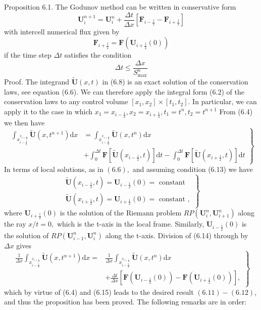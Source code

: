 Proposition 6.1. The Godunov method can be written in conservative form
$$
\mathbf{U}_{i}^{n+1}=\mathbf{U}_{i}^{n}+\frac{\Delta t}{\Delta x}\left[\mathbf{F}_{i-\frac{1}{2}}-\mathbf{F}_{i+\frac{1}{2}}\right]
$$
with intercell numerical flux given by
$$
\mathbf{F}_{i+\frac{1}{2}}=\mathbf{F}\left(\mathbf{U}_{i+\frac{1}{2}}(0)\right)
$$
if the time step $\Delta t$ satisfies the condition
$$
\Delta t \leq \frac{\Delta x}{S_{\max }^{n}}
$$
Proof. The integrand $\widetilde{\mathbf{U}}(x, t)$ in (6.8) is an exact solution of the conservation laws, see equation (6.6). We can therefore apply the integral form (6.2) of the conservation laws to any control volume $\left[x_{1}, x_{2}\right] \times\left[t_{1}, t_{2}\right] .$ In particular, we can apply it to the case in which $x_{1}=x_{i-\frac{1}{2}}, x_{2}=x_{i+\frac{1}{2}}, t_{1}=t^{n}, t_{2}=t^{n+1}$
From (6.4) we then have
$$\left.\begin{array}{rl}
\int_{x_{i-\frac{1}{2}}^{x_{i+\frac{1}{2}}}} \widetilde{\mathbf{U}}\left(x, t^{n+1}\right) \mathrm{d} x & =\int_{x_{i-\frac{1}{2}}^{x_{i+\frac{1}{2}}}} \widetilde{\mathbf{U}}\left(x, t^{n}\right) \mathrm{d} x \\
& +\int_{0}^{\Delta t} \mathbf{F}\left[\widetilde{\mathbf{U}}\left(x_{i-\frac{1}{2}}, t\right)\right] \mathrm{d} t-\int_{0}^{\Delta t} \mathbf{F}\left[\widetilde{\mathbf{U}}\left(x_{i+\frac{1}{2}}, t\right)\right] \mathrm{d} t
\end{array}\right\}
$$
In terms of local solutions, as in $(6.6),$ and assuming condition (6.13) we have
$$
\left.\begin{array}{l}
\widetilde{\mathbf{U}}\left(x_{i-\frac{1}{2}}, t\right)=\mathbf{U}_{i-\frac{1}{2}}(0)=\text { constant } \\
\widetilde{\mathbf{U}}\left(x_{i+\frac{1}{2}}, t\right)=\mathbf{U}_{i+\frac{1}{2}}(0)=\text { constant },
\end{array}\right\}
$$
where $\mathbf{U}_{i+\frac{1}{2}}(0)$ is the solution of the Riemann problem $R P\left(\mathbf{U}_{i}^{n}, \mathbf{U}_{i+1}^{n}\right)$ along the ray $x / t=0,$ which is the t-axis in the local frame. Similarly, $\mathbf{U}_{i-\frac{1}{2}}(0)$ is the solution of $R P\left(\mathbf{U}_{i-1}^{n}, \mathbf{U}_{i}^{n}\right)$ along the t-axis. Division of (6.14) through by $\Delta x$ gives
$$
\left.\begin{array}{rl}
\frac{1}{\Delta x} \int_{x_{i-\frac{1}{2}}^{x_{i+\frac{1}{2}}}} \tilde{\mathbf{U}}\left(x, t^{n+1}\right) \mathrm{d} x= & \frac{1}{\Delta x} \int_{x_{i-\frac{1}{2}}^{x_{i+\frac{1}{2}}}} \widetilde{\mathbf{U}}\left(x, t^{n}\right) \mathrm{d} x \\
& +\frac{\Delta t}{\Delta x}\left[\mathbf{F}\left(\mathbf{U}_{i-\frac{1}{2}}(0)\right)-\mathbf{F}\left(\mathbf{U}_{i+\frac{1}{2}}(0)\right)\right],
\end{array}\right\}
$$
which by virtue of (6.4) and (6.15) leads to the desired result $(6.11)-(6.12),$ and thus the proposition has been proved.
The following remarks are in order:
